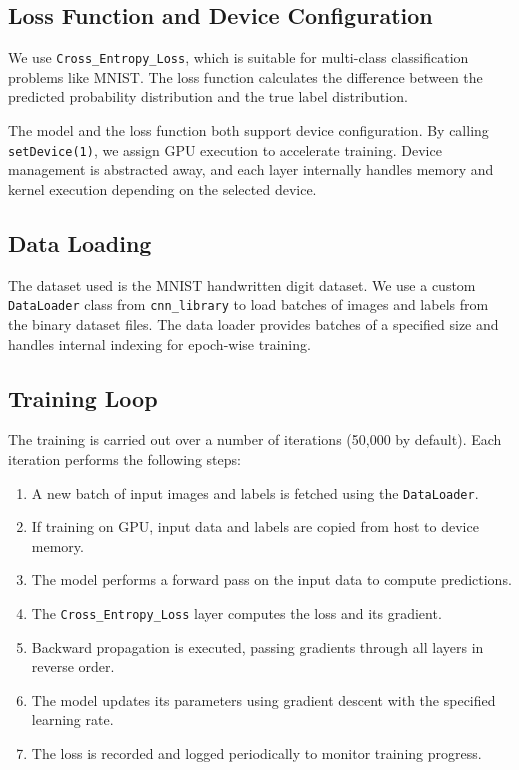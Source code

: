 \subsection{Loss Function and Device Configuration}

We use \texttt{Cross\_Entropy\_Loss}, which is suitable for multi-class classification problems like MNIST. The loss function calculates the difference between the predicted probability distribution and the true label distribution.

The model and the loss function both support device configuration. By calling \texttt{setDevice(1)}, we assign GPU execution to accelerate training. Device management is abstracted away, and each layer internally handles memory and kernel execution depending on the selected device.

\subsection{Data Loading}

The dataset used is the MNIST handwritten digit dataset. We use a custom \texttt{DataLoader} class from \texttt{cnn\_library} to load batches of images and labels from the binary dataset files. The data loader provides batches of a specified size and handles internal indexing for epoch-wise training.

\subsection{Training Loop}

The training is carried out over a number of iterations (50,000 by default). Each iteration performs the following steps:

\begin{enumerate}
    \item A new batch of input images and labels is fetched using the \texttt{DataLoader}.
    \item If training on GPU, input data and labels are copied from host to device memory.
    \item The model performs a forward pass on the input data to compute predictions.
    \item The \texttt{Cross\_Entropy\_Loss} layer computes the loss and its gradient.
    \item Backward propagation is executed, passing gradients through all layers in reverse order.
    \item The model updates its parameters using gradient descent with the specified learning rate.
    \item The loss is recorded and logged periodically to monitor training progress.
\end{enumerate}

